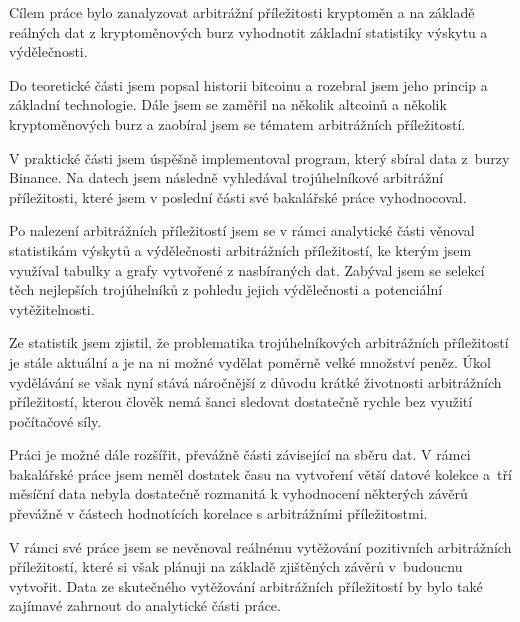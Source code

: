 \documentclass[thesis=B,czech]{FITthesis}[2019/03/21]
\begin{document}
\begin{conclusion}
Cílem práce bylo zanalyzovat arbitrážní příležitosti kryptoměn a na základě reálných dat z kryptoměnových burz vyhodnotit základní statistiky výskytu a výdělečnosti.

Do teoretické části jsem popsal historii bitcoinu a rozebral jsem jeho princip a základní technologie. Dále jsem se zaměřil na několik altcoinů a několik kryptoměnových burz a zaobíral jsem se tématem arbitrážních příležitostí. 

V praktické části jsem úspěšně implementoval program, který sbíral data z~burzy Binance. Na datech jsem následně vyhledával trojúhelníkové arbitrážní příležitosti, které jsem v poslední části své bakalářské práce vyhodnocoval. 

Po nalezení arbitrážních příležitostí jsem se v rámci analytické části věnoval statistikám výskytů a výdělečnosti arbitrážních příležitostí, ke kterým jsem využíval tabulky a grafy vytvořené z nasbíraných dat. Zabýval jsem se selekcí těch nejlepších trojúhelníků z pohledu jejich výdělečnosti a potenciální vytěžitelnosti.

Ze statistik jsem zjistil, že problematika trojúhelníkových arbitrážních příležitostí je stále aktuální a je na ni možné vydělat poměrně velké množství peněz. Úkol vydělávání se však nyní stává náročnější z důvodu krátké životnosti arbitrážních příležitostí, kterou člověk nemá šanci sledovat dostatečně rychle bez využití počítačové síly.

Práci je možné dále rozšířit, převážně části závisející na sběru dat. V rámci bakalářské práce jsem neměl dostatek času na vytvoření větší datové kolekce a~tří měsíční data nebyla dostatečně rozmanitá k vyhodnocení některých závěrů převážně v částech hodnotících korelace s arbitrážními příležitostmi.

V rámci své práce jsem se nevěnoval reálnému vytěžování pozitivních arbitrážních příležitostí, které si však plánuji na základě zjištěných závěrů v~budoucnu vytvořit. Data ze skutečného vytěžování arbitrážních příležitostí by bylo také zajímavé zahrnout do analytické části práce.

\end{conclusion}

% 
% 

\printbibliography

\appendix
\end{document}
